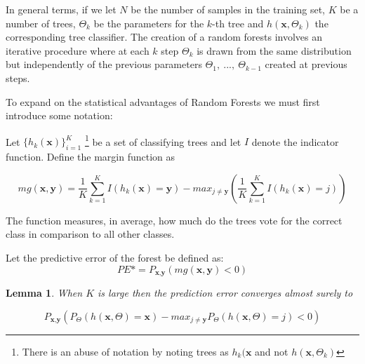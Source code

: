 \documentclass{article}%
\newtheorem{lemma}[theorem]{Lemma}
\theoremstyle{definition}
\begin{document}
In general terms, if we let $N$ be the number of samples in the training set, $K$ be a number of trees, $\Theta_k$ be the parameters for the $k$-th tree and $h(\textbf{x},\Theta_k)$ the corresponding tree classifier.  The creation of a random forests involves an iterative procedure where at each $k$ step $\Theta_k$ is drawn from the same distribution but independently of the previous parameters $\Theta_1, \ ..., \ \Theta_{k-1}$ created at previous steps. 

To expand on the statistical advantages of Random Forests we must first introduce some notation:

Let $\{h_k(\textbf{x})\}_{i=1}^K$  \footnote{There is an abuse of notation by noting trees as $h_k(\textbf{x}$ and not $h(\textbf{x}, \Theta_k)$ } be a set of classifying trees and let $I$ denote the indicator function.  Define the margin function as

$$mg(\textbf{x},\textbf{y}) =  \frac{1}{K}   \sum_{k=1}^K I(h_k(\textbf{x}) = \textbf{y})  
- max_{j\neq \textbf{y}}\left(\frac{1}{K} \sum_{k=1}^K I(h_k(\textbf{x}) = j) \right) $$ \label{eq:rf-marginFun}

The function measures, in average, how much do the trees vote for the correct class in comparison to all other classes. 


Let the predictive error of the forest be defined as:
$$ PE* = P_{\textbf{x}, \textbf{y} }(mg(\textbf{x}, \textbf{y}) < 0) $$



\begin{lemma}
When $K$ is large then the prediction error converges almost surely to 

$$ P_{\textbf{x}, \textbf{y} } \left( P_{\Theta} (h(\textbf{x}, \Theta) = \textbf{x}) - max_{j \neq \textbf{y}} P_{\Theta} (h(\textbf{x}, \Theta) = j) < 0 \right ) $$
\end{lemma}
\end{document}

